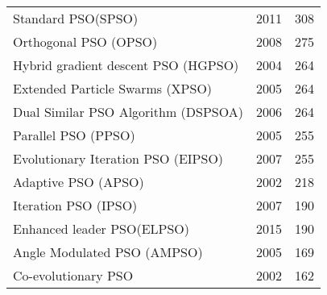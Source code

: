 \begin{table}[H]
\begin{tabular}{lcc}
Standard PSO(SPSO) &2011 &308 \\
Orthogonal PSO (OPSO) &2008 &275 \\
Hybrid gradient descent PSO (HGPSO) &2004 &264 \\
Extended Particle Swarms (XPSO) &2005 &264 \\
Dual Similar PSO Algorithm (DSPSOA) &2006 &264 \\
Parallel PSO (PPSO) &2005 &255 \\
Evolutionary Iteration PSO (EIPSO) &2007 &255 \\
Adaptive PSO (APSO) &2002 &218 \\
Iteration PSO (IPSO) &2007 &190 \\
Enhanced leader PSO(ELPSO) &2015 &190 \\
Angle Modulated PSO (AMPSO) &2005 &169 \\
Co-evolutionary PSO &2002 &162 \\
\bottomrule
\end{tabular}
\end{table}
